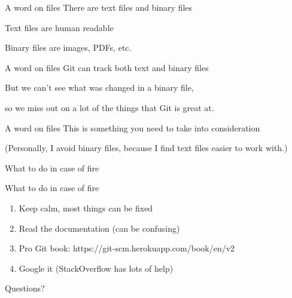 \documentclass{beamer}
\begin{document}
\begin{frame}{A word on files}
  \center
  \huge There are text files and binary files
  \pause

  \Large Text files are human readable
  \pause

  \Large Binary files are images, PDFs, etc.
\end{frame}

\begin{frame}{A word on files}
  \center
  \Huge Git can track both text and binary files
  \pause

  \Large But we can't see what was changed in a binary file,

  \Large so we miss out on a lot of the things that Git is great at.
\end{frame}

\begin{frame}{A word on files}
  \center
  \Huge This is something you need to take into consideration
  \pause

  \Large (Personally, I avoid binary files, because I find text files
  easier to work with.)
\end{frame}

\begin{frame}{}
  \center
  \Huge What to do in case of fire
\end{frame}

\begin{frame}{What to do in case of fire}
  \begin{enumerate}
    \item Keep calm, most things can be fixed
    \item Read the documentation (can be confusing)
    \item Pro Git book: https://git-scm.herokuapp.com/book/en/v2
    \item Google it (StackOverflow has lots of help)
  \end{enumerate}
\end{frame}

\begin{frame}{}
  \center
  \Huge Questions?
\end{frame}
\end{document}
